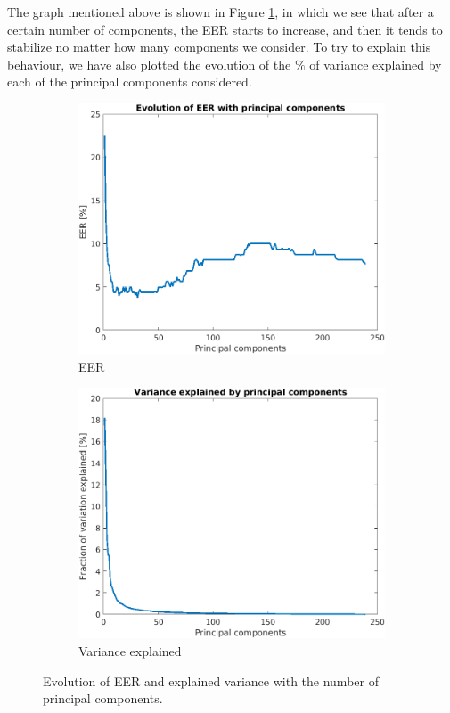 \documentclass[11pt]{article}
\begin{document}
The graph mentioned above is shown in Figure \ref{fig:ex2b}, in which we see that after a certain number of components, the EER starts to increase, and then it tends to stabilize no matter how many components we consider. To try to explain this behaviour, we have also plotted the evolution of the $\%$ of variance explained by each of the principal components considered.

\begin{figure}[h!]
  \centering
       \begin{subfigure}[t]{0.4\textwidth}
         \centering
         \includegraphics[scale=0.45]{img/2b_eer}
         \caption{EER}
     \end{subfigure}%
     \quad \quad
     \begin{subfigure}[t]{0.4\textwidth}
         \centering
         \includegraphics[scale=0.475]{img/2b_var}
         \caption{Variance explained}
     \end{subfigure}
    \caption{Evolution of EER and explained variance with the number of principal components.}
    \label{fig:ex2b}
\end{figure}
\end{document}
